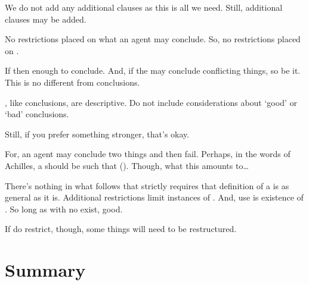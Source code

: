 \begin{note}

  We do not add any additional clauses as this is all we need.
  Still, additional clauses may be added.

  No restrictions placed on what an agent may conclude.
  So, no restrictions placed on .

  If \fc{} then enough to conclude.
  And, if the may conclude conflicting things, so be it.
  This is no different from conclusions.

  , like conclusions, are descriptive.
  Do not include considerations about `good' or `bad' conclusions.
\end{note}

\begin{note}
  Still, if you prefer something stronger, that's okay.

  For, an agent may conclude two things and then fail.
  Perhaps, in the words of Achilles, a \fc{} should be such that  (\cite[280]{Carroll:1895uj}).
  Though, what this amounts to\dots

  There's nothing in what follows that strictly requires that definition of a \fc{} is as general as it is.
  Additional restrictions limit instances of .
  And, use is existence of .
  So long as  with no \wit{} exist, good.

  If do restrict, though, some things will need to be restructured.
\end{note}

\section*{Summary}



